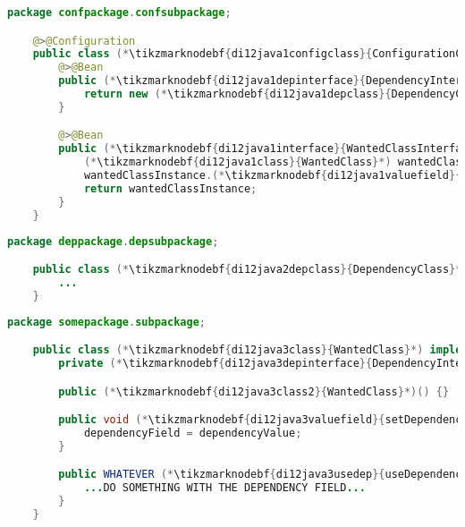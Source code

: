 \enlargethispage{20mm}
\thispagestyle{empty}
\begin{lstlisting}[language=Java, title={Configuration class}]
    package confpackage.confsubpackage;

    @>@Configuration
    public class (*\tikzmarknodebf{di12java1configclass}{ConfigurationClass}*) {
        @>@Bean
        public (*\tikzmarknodebf{di12java1depinterface}{DependencyInterface}*) (*\tikzmarknodebf{di12java1depbeanid}{dependencyBeanMethod}*)() {
            return new (*\tikzmarknodebf{di12java1depclass}{DependencyClass}*)(...);
        }

        @>@Bean
        public (*\tikzmarknodebf{di12java1interface}{WantedClassInterface}*) (*\tikzmarknodebf{di12java1beanid}{wantedBeanMethod}*)() {
            (*\tikzmarknodebf{di12java1class}{WantedClass}*) wantedClassInstance = new (*\tikzmarknodebf{di12java1class2}{WantedClass}*)();
            wantedClassInstance.(*\tikzmarknodebf{di12java1valuefield}{setDependencyField}*)((*\tikzmarknodebf{di12java1depbeanid2}{dependencyBeanMethod}*)());
            return wantedClassInstance;
        }
    }
\end{lstlisting}
\begin{lstlisting}[language=Java, title={Dependency class}]
    package deppackage.depsubpackage;

    public class (*\tikzmarknodebf{di12java2depclass}{DependencyClass}*) implements (*\tikzmarknodebf{di12java2depinterface}{DependencyInterface}*) {
        ...
    }
\end{lstlisting}
\begin{lstlisting}[language=Java, title={Wanted class with the zero--parameter constructor and the setter method}]
    package somepackage.subpackage;

    public class (*\tikzmarknodebf{di12java3class}{WantedClass}*) implements (*\tikzmarknodebf{di12java3interface}{WantedClassInterface}*) {
        private (*\tikzmarknodebf{di12java3depinterface}{DependencyInterface}*) dependencyField;

        public (*\tikzmarknodebf{di12java3class2}{WantedClass}*)() {}

        public void (*\tikzmarknodebf{di12java3valuefield}{setDependencyField}*)((*\tikzmarknodebf{di12java3depinterface2}{DependencyInterface}*) dependencyField){
            dependencyField = dependencyValue;
        }

        public WHATEVER (*\tikzmarknodebf{di12java3usedep}{useDependency}*)() {
            ...DO SOMETHING WITH THE DEPENDENCY FIELD...
        }
    }
\end{lstlisting}
